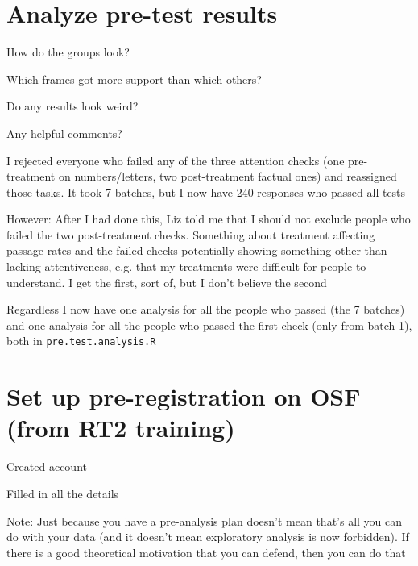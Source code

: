 \documentclass[12pt]{article}
\begin{document}
\section*{Analyze pre-test results}
	\begin{coi}
		\item How do the groups look?
		\item Which frames got more support than which others?
		\item Do any results look weird?
		\item Any helpful comments?
		\item I rejected everyone who failed any of the three attention checks (one pre-treatment on numbers/letters, two post-treatment factual ones) and reassigned those tasks. It took 7 batches, but I now have 240 responses who passed all tests
		\item However: After I had done this, Liz told me that I should not exclude people who failed the two post-treatment checks. Something about treatment affecting passage rates and the failed checks potentially showing something other than lacking attentiveness, e.g. that my treatments were difficult for people to understand. I get the first, sort of, but I don't believe the second
		\item Regardless I now have one analysis for all the people who passed (the 7 batches) and one analysis for all the people who passed the first check (only from batch 1), both in \texttt{pre.test.analysis.R}
	\end{coi}

\section*{Set up pre-registration on OSF (from RT2 training)}
	\begin{coi}
		\item Created account
		\item Filled in all the details
		\item Note: Just because you have a pre-analysis plan doesn't mean that's all you can do with your data (and it doesn't mean exploratory analysis is now forbidden). If there is a good theoretical motivation that you can defend, then you can do that
	\end{coi}
\end{document}
